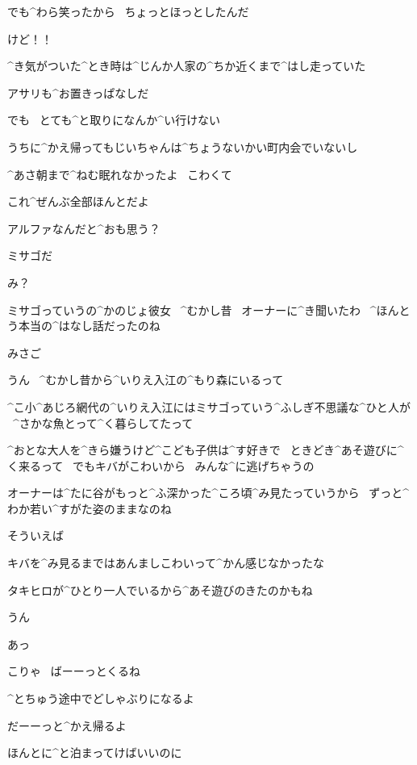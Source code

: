\Takahiro でも^{わら}{笑}ったから
\ ちょっとほっとしたんだ

\Takahiro けど！！

\page[51]
\Takahiro ^{き}{気}がついた^{とき}{時}は^{じんか}{人家}の^{ちか}{近}くまで^{はし}{走}っていた

\Takahiro アサリも^{お}{置}きっぱなしだ

\Takahiro でも
\ とても^{と}{取}りになんか^{い}{行}けない

\Takahiro うちに^{かえ}{帰}ってもじいちゃんは^{ちょうないかい}{町内会}でいないし

\Takahiro ^{あさ}{朝}まで^{ねむ}{眠}れなかったよ
\ こわくて

\Takahiro これ^{ぜんぶ}{全部}ほんとだよ

\Takahiro アルファなんだと^{おも}{思}う？

\page[52]
\Alpha ミサゴだ

\Takahiro み？

\Alpha ミサゴっていうの^{かのじょ}{彼女}
\ ^{むかし}{昔}
\ オーナーに^{き}{聞}いたわ
\ ^{ほんとう}{本当}の^{はなし}{話}だったのね

\Takahiro みさご

\Alpha うん
\ ^{むかし}{昔}から^{いりえ}{入江}の^{もり}{森}にいるって

\page[53]
\Alpha ^{こ}{小}^{あじろ}{網代}の^{いりえ}{入江}にはミサゴっていう^{ふしぎ}{不思議}な^{ひと}{人}が
\ ^{さかな}{魚}とって^{く}{暮}らしてたって

\Alpha ^{おとな}{大人}を^{きら}{嫌}うけど^{こども}{子供}は^{す}{好}きで
\ ときどき^{あそ}{遊}びに^{く}{来}るって
\ でもキバがこわいから
\ みんな^{に}{逃}げちゃうの

\Alpha オーナーは^{たに}{谷}がもっと^{ふ}{深}かった^{ころ}{頃}^{み}{見}たっていうから
\ ずっと^{わか}{若}い^{すがた}{姿}のままなのね

\page[54]
\Takahiro そういえば

\Takahiro キバを^{み}{見}るまではあんましこわいって^{かん}{感}じなかったな

\Alpha タキヒロが^{ひとり}{一人}でいるから^{あそ}{遊}びのきたのかもね

\Takahiro うん

\Takahiro あっ

\Alpha こりゃ
\ ばーーっとくるね

\page[55]
\Alpha ^{とちゅう}{途中}でどしゃぶりになるよ

\Takahiro だーーっと^{かえ}{帰}るよ

\Alpha ほんとに^{と}{泊}まってけばいいのに

